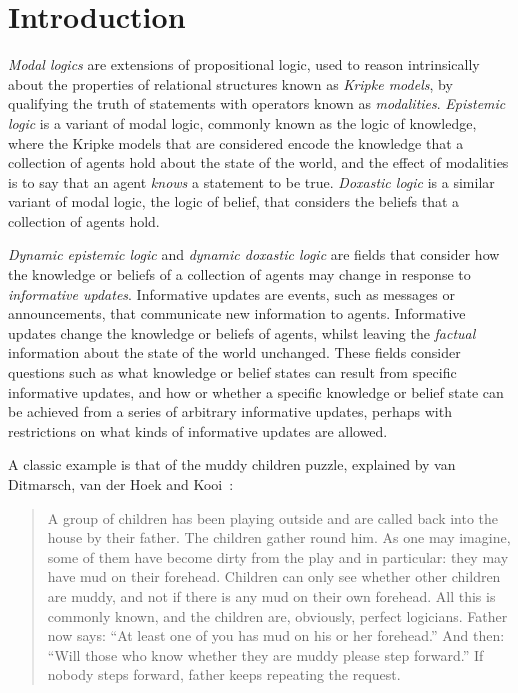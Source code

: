 \chapter{Introduction}


{\em Modal logics} are extensions of propositional logic, used to reason
intrinsically about the properties of relational structures known as {\em
Kripke models}, by qualifying the truth of statements with operators known as
{\em modalities}. {\em Epistemic logic} is a variant of modal logic, commonly
known as the logic of knowledge, where the Kripke models that are considered
encode the knowledge that a collection of agents hold about the state of the
world, and the effect of modalities is to say that an agent {\em knows} a
statement to be true. {\em Doxastic logic} is a similar variant of modal logic,
the logic of belief, that considers the beliefs that a collection of agents
hold.

{\em Dynamic epistemic logic} and {\em dynamic doxastic logic} are fields that
consider how the knowledge or beliefs of a collection of agents may change in
response to {\em informative updates}. Informative updates are events, such as
messages or announcements, that communicate new information to agents. 
Informative updates change the knowledge or beliefs of agents, whilst leaving
the {\em factual} information about the state of the world unchanged.  These
fields consider questions such as what knowledge or belief states can result
from specific informative updates, and how or whether a specific knowledge or
belief state can be achieved from a series of arbitrary informative updates,
perhaps with restrictions on what kinds of informative updates are allowed.

A classic example is that of the muddy children puzzle, explained by van
Ditmarsch, van der Hoek and Kooi~\cite{vanditmarsch2007dynamic}:

\begin{quote}
A group of children has been playing outside and are called back into the house
by their father. The children gather round him. As one may imagine, some of them
have become dirty from the play and in particular: they may have mud on their
forehead. Children can only see whether other children are muddy, and not if
there is any mud on their own forehead. All this is commonly known, and the
children are, obviously, perfect logicians. Father now says: “At least one of
you has mud on his or her forehead.” And then: “Will those who know whether they
are muddy please step forward.” If nobody steps forward, father keeps repeating
the request.
\end{quote}

